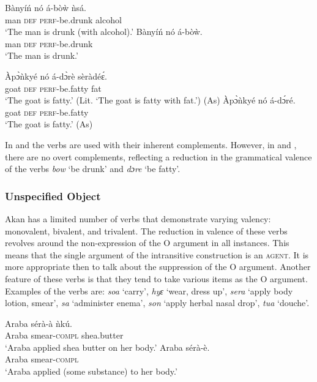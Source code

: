 \documentclass[output=paper]{langsci/langscibook}
\begin{document}
\ea\label{ex:38.osam}
\ea\label{ex:38a.osam}
\gll   Bànyíń  nó  á-bòẁ    ǹsá.\\
       man  \textsc{def}  \textsc{perf}-be.drunk  alcohol\\
\glt `The man is drunk (with alcohol).'
\ex\label{ex:38b.osam}
\gll  Bànyíń  nó  á-bòẁ.\\
       man  \textsc{def}  \textsc{perf}-be.drunk\\
\glt `The man is drunk.'
\z 
\z 


\ea\label{ex:39.osam}
\ea\label{ex:39a.osam}
\gll   Àpɔ̀ǹkyé  nó  á-dɔ̀rè      sèràdé\'{ɛ}.\\
       goat    \textsc{def}  \textsc{perf}-be.fatty    fat\\
\glt   `The goat is fatty.' (Lit. `The goat is fatty with fat.') (As)
\ex\label{ex:39b.osam}
\gll   Àpɔ̀ǹkyé  nó  á-dɔ́ré.      \\
       goat    \textsc{def}  \textsc{perf}-be.fatty  \\
\glt   `The goat is fatty.' (As)
\z 
\z 


In  and  the verbs are used with their inherent complements. However, in  and , there are no overt complements, reflecting a reduction in the grammatical valence of the verbs \textit{bow} `be drunk' and \textit{dɔre} `be fatty'.

\subsubsection{Unspecified Object}\label{§4.5.2:unspecified.osam}

Akan has a limited number of verbs that demonstrate varying valency: monovalent, bivalent, and trivalent. The reduction in valence of these verbs revolves around the non-expression of the O argument in all instances. This means that the single argument of the intransitive construction is an \textsc{agent}. It is more appropriate then to talk about the suppression of the O argument. Another feature of these verbs is that they tend to take various items as the O argument. Examples of the verbs are: \textit{soa} `carry', \textit{hyɛ} `wear, dress up', \textit{sera} `apply body lotion, smear', \textit{sa} `administer enema', \textit{son} `apply herbal nasal drop', \textit{tua} `douche'.

\ea\label{ex:40.osam}
\ea\label{ex:40a.osam}
\gll   Araba  sérà-à    ǹkú.\\
       Araba  smear-\textsc{compl}  shea.butter\\
\glt `Araba applied shea butter on her body.'
\ex\label{ex:40b.osam}
\gll   Araba  sérà-è.\\
       Araba  smear-\textsc{compl}\\
\glt `Araba applied (some substance) to her body.'
\z 
\z 
\end{document}
